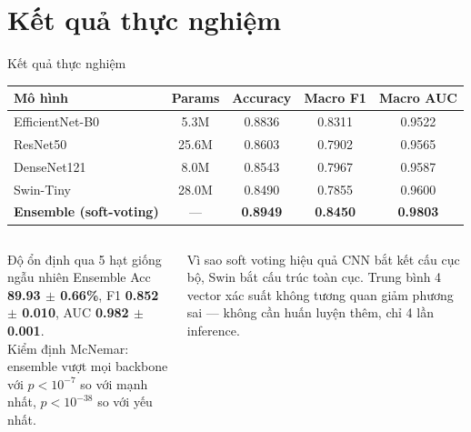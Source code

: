 \documentclass[10pt, aspectratio=169]{beamer}
\renewcommand{\framesubtitle}[1]{%
  \vspace*{-0.3em}\noindent{\large\bfseries\textcolor{usthdark}{#1}}\par\vspace{0.6em}%
}
\begin{document}
\section{Kết quả thực nghiệm}
\begin{frame}{Kết quả thực nghiệm}
    \framesubtitle{Mô hình đơn và Ensemble}
    \scriptsize
    \begin{table}[]
        \centering
        \begin{tabular}{lcccc}
        \toprule
        \rowcolor{usthblue!25}
        \textbf{Mô hình} & \textbf{Params} & \textbf{Accuracy} & \textbf{Macro F1} & \textbf{Macro AUC} \\
        \midrule
        EfficientNet-B0 & 5.3M  & 0.8836 & 0.8311 & 0.9522 \\
        ResNet50        & 25.6M & 0.8603 & 0.7902 & 0.9565 \\
        DenseNet121     & 8.0M  & 0.8543 & 0.7967 & 0.9587 \\
        Swin-Tiny       & 28.0M & 0.8490 & 0.7855 & 0.9600 \\
        \rowcolor{usthlight} \textbf{Ensemble (soft-voting)} & --- & \textbf{0.8949} & \textbf{0.8450} & \textbf{0.9803} \\
        \bottomrule
        \end{tabular}
    \end{table}

    \vspace{0.3cm}
    \begin{columns}[T]
        \begin{block}{Độ ổn định qua 5 hạt giống ngẫu nhiên}
            \footnotesize
            Ensemble Acc \textbf{89.93 $\pm$ 0.66\%}, F1 \textbf{0.852 $\pm$ 0.010}, AUC \textbf{0.982 $\pm$ 0.001}. \\[2pt]
            Kiểm định McNemar: ensemble vượt mọi backbone với $p < 10^{-7}$ so với mạnh nhất, $p < 10^{-38}$ so với yếu nhất.
        \end{block}

        \begin{block}{Vì sao soft voting hiệu quả}
            \footnotesize
            CNN bắt kết cấu cục bộ, Swin bắt cấu trúc toàn cục. Trung bình 4 vector xác suất không tương quan giảm phương sai --- không cần huấn luyện thêm, chỉ 4 lần inference.
        \end{block}
    \end{columns}
\end{frame}
\end{document}
